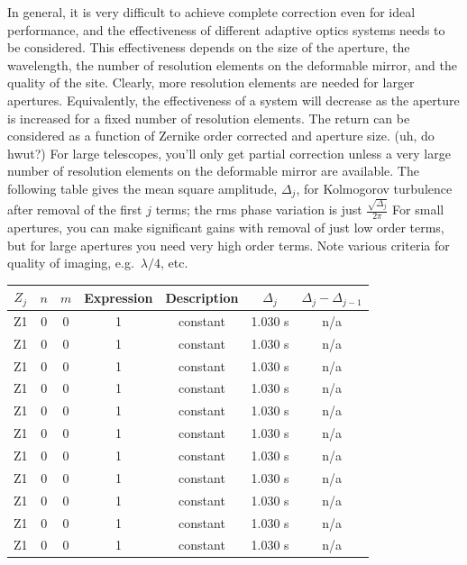\documentclass[12pt]{article}
\begin{document}
In general, it is very difficult to achieve complete correction even
for ideal performance, and the effectiveness of
different adaptive optics systems needs to be considered.
This effectiveness depends on the
size of the aperture, the wavelength, the number of resolution
elements on the deformable mirror, and the quality of the site.
Clearly, more resolution elements are needed for larger apertures.
Equivalently, the effectiveness of a system will decrease as the
aperture is increased for a fixed number of resolution elements.
The return can be considered as a function of Zernike order corrected and
aperture size. (\textcolor{myBlue}{uh, do hwut?})
For large telescopes, you'll only get partial
correction unless a very large number of resolution elements on the
deformable mirror are available. The following table gives the mean
square amplitude, $\Delta_{j}$, for Kolmogorov turbulence after
removal of the first $j$ terms; the rms phase variation is just
$ \frac{\sqrt{\Delta_{j}}}{2\pi}  $
For small apertures, you can make
significant gains with removal of just low order terms, but for large
apertures you need very high order terms. Note various criteria for
quality of imaging, e.g.\ $\lambda/4$, etc.
\newpage
\begin{table}[th]
\centering
\begin{tabular}{c c c c c c c}
    $Z_j$ & $n$ & $m$ & Expression & Description &
    $\Delta_j$ & $\Delta_j - \Delta_{j-1}$\\
    \hline\hline
    Z1 & 0 & 0 & 1 & constant & 1.030 s & n/a\\
    Z1 & 0 & 0 & 1 & constant & 1.030 s & n/a\\
    Z1 & 0 & 0 & 1 & constant & 1.030 s & n/a\\
    Z1 & 0 & 0 & 1 & constant & 1.030 s & n/a\\
    Z1 & 0 & 0 & 1 & constant & 1.030 s & n/a\\
    Z1 & 0 & 0 & 1 & constant & 1.030 s & n/a\\
    Z1 & 0 & 0 & 1 & constant & 1.030 s & n/a\\
    Z1 & 0 & 0 & 1 & constant & 1.030 s & n/a\\
    Z1 & 0 & 0 & 1 & constant & 1.030 s & n/a\\
    Z1 & 0 & 0 & 1 & constant & 1.030 s & n/a\\
    Z1 & 0 & 0 & 1 & constant & 1.030 s & n/a\\
    \hline
    \end{tabular}
\end{table}
\end{document}
